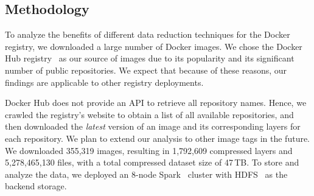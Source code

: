 \subsection{Methodology}
\label{sec:methodology}

%

To analyze the benefits of different data reduction techniques for the Docker registry,
we downloaded a large number of Docker images.
%
We chose the Docker Hub registry~\cite{docker-hub} as our source of images
due to its popularity and its significant number
of public repositories.
%
We expect that because of these reasons, our findings are applicable to other
registry deployments.

Docker Hub does not provide an API to retrieve all repository names.
Hence, we crawled the registry's website to obtain a list of all available
repositories, and then downloaded the \emph{latest} version of an image and its
corresponding layers for each repository.
%
We plan to extend our analysis to other image tags in the future.
%
We downloaded 355,319 images, resulting in 1,792,609 compressed layers
and 5,278,465,130 files, with a total compressed dataset size of 47\,TB.
%
%
To store and analyze the data, we deployed an 8-node Spark~\cite{spark}
cluster with HDFS~\cite{hdfs} as the backend storage.

